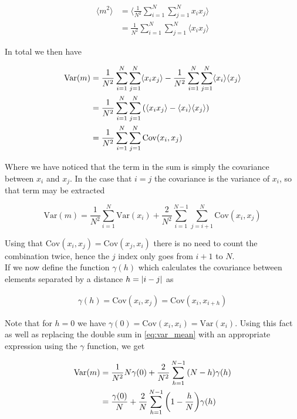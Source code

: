 \documentclass[aps,reprint,superscriptaddress,nofootinbib]{revtex4-2}
\newcommand{\Var}{\mathrm{Var}}     %
\newcommand{\Cov}{\mathrm{Cov}}
\begin{document}
    \begin{align*}
        \langle m^2 \rangle &= \langle \frac{1}{N^2}\sum_{i=1}^N\sum_{j=1}^N x_i x_j \rangle \\
        &= \frac{1}{N^2}\sum_{i=1}^N\sum_{j=1}^N\langle x_i x_j \rangle
    \end{align*}
    
    In total we then have
    
    \begin{align*}
        \Var(m) &= \frac{1}{N^2}\sum_{i=1}^N\sum_{j=1}^N\langle x_i x_j \rangle - 
        \frac{1}{N^2}\sum_{i=1}^N\sum_{j=1}^N\langle x_i \rangle \langle x_j \rangle \\
        &= \frac{1}{N^2}\sum_{i=1}^N\sum_{j=1}^N\qty(\langle x_i x_j \rangle - \langle x_i \rangle \langle x_j \rangle) \\
        &= \frac{1}{N^2}\sum_{i=1}^N\sum_{j=1}^N\Cov(x_i, x_j)
    \end{align*}
    
    Where we have noticed that the term in the sum is simply the covariance between $x_i$ and $x_j$. In the case that $i=j$ the covariance is the variance of $x_i$, so that term may be extracted
    
    \begin{equation}\label{eq:var_mean}
        \Var(m) = \frac{1}{N^2}\sum_{i=1}^N\Var(x_i) + \frac{2}{N^2}\sum_{i=1}^{N-1}\sum_{j=i+1}^N\Cov(x_i, x_j)
    \end{equation}
    
    Using that $\Cov(x_i, x_j) = \Cov(x_j, x_i)$ there is no need to count the combination twice, hence the $j$ index only goes from $i+1$ to $N$.\\
    If we now define the function $\gamma(h)$ which calculates the covariance between elements separated by a distance $h = \abs{i - j}$ as
    
    \begin{align*}
        \gamma(h) = \Cov(x_i, x_j) = \Cov(x_i, x_{i+h})
    \end{align*}
    
    Note that for $h = 0$ we have $\gamma(0) = \Cov(x_i, x_i) = \Var(x_i)$. Using this fact as well as replacing the double sum in \ref{eq:var_mean} with an appropriate expression using the $\gamma$ function, we get
    
    \begin{align*}
        \Var(m) &= \frac{1}{N^2}N\gamma(0) + \frac{2}{N^2}\sum_{h=1}^{N-1}\qty(N-h)\gamma(h) \\
        &= \frac{\gamma(0)}{N} + \frac{2}{N}\sum_{h=1}^{N-1}\qty(1-\frac{h}{N})\gamma(h)
    \end{align*}
    
\end{document}
